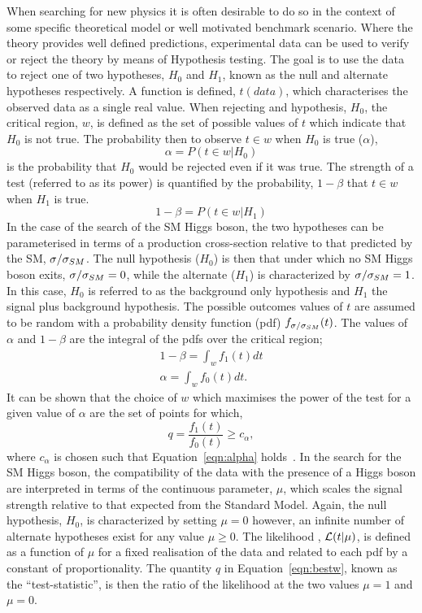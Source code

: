 When searching for new physics it is often desirable to do so in the context of
some specific theoretical model or well motivated benchmark scenario.
Where the theory provides well defined predictions,
experimental data can be used to verify or reject the theory
by means of Hypothesis testing. The goal is to use the data 
to reject one of two hypotheses,
$H_{0}$ and $H_{1}$, known as the null and alternate hypotheses
respectively. A function is defined, $t(data)$,
which characterises the observed data as a single real value. When rejecting 
and hypothesis, $H_{0}$, the critical
region, $w$, is defined as the set of possible values of $t$
which indicate that $H_{0}$ is not true. The probability then 
to observe $t\in w$ when $H_{0}$ is true ($\alpha$), 
\begin{equation}
\alpha = P(t\in w|H_{0})
\end{equation}
is the probability that $H_{0}$ would be rejected even if it was true.
The strength of a test (referred to as its power) is quantified by 
the probability, $1-\beta$ that $t \in  w$ when $H_{1}$ is true.
\begin{equation}
1-\beta = P(t\in w|H_{1})
\end{equation}
In the case of the search of the SM Higgs boson, the two hypotheses
can be parameterised in terms of a production cross-section relative
to that predicted by the SM, $\sigma/\sigma_{SM}$.  
The null hypothesis ($H_{0}$) is then that under which no SM Higgs boson exits,
$\sigma/\sigma_{SM}=0$, while the alternate ($H_{1}$) is characterized by $\sigma/\sigma_{SM}=1$.
In this case, $H_{0}$ is referred to as the background only hypothesis
and $H_{1}$ the signal plus background hypothesis.
The possible outcomes values of $t$ are assumed to be random with a probability density
function (pdf) $f_{\sigma/\sigma_{SM}}(t)$. The values of $\alpha$ and $1-\beta$ are the integral of the pdfs
over the critical region;
\begin{eqnarray}
1-\beta =  \int_{w}f_{1}(t)dt\\ 
\alpha =  \int_{w}f_{0}(t)dt.
\label{eqn:alpha}
\end{eqnarray}
It can be shown that the choice of $w$ which maximises the power of the test for 
a given value of $\alpha$ are the set of points for which,
\begin{equation} 
	q = \frac {\displaystyle f_{1}(t)}{\displaystyle f_{0}(t)} \ge c_{\alpha},
\label{eqn:bestw}
\end{equation}
where $c_{\alpha}$ is chosen such that Equation~\ref{eqn:alpha} holds~\citep{null}.
In the search for the SM Higgs boson, the compatibility of the data
with the presence of a Higgs boson are interpreted in terms of the 
continuous parameter, $\mu$, which scales the signal strength relative to that expected
from the Standard Model. 
Again, the null hypothesis, $H_{0}$, is characterized by setting $\mu=0$ however,
an infinite number of alternate hypotheses exist for any value $\mu \ge 0$.
The likelihood , $\mathcal{L}(t|\mu)$, is defined as a function of $\mu$ for a fixed 
realisation of the data and related to each pdf by a constant of proportionality.
The quantity $q$ in Equation~\ref{eqn:bestw}, known as the ``test-statistic'', is then
the ratio of the likelihood at the two values $\mu=1$ and $\mu=0$. 

